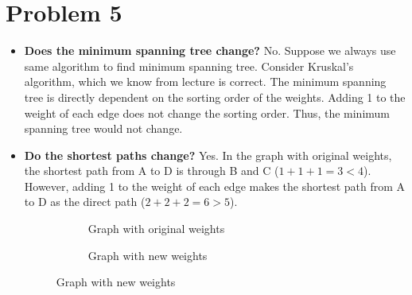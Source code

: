 \documentclass{article}
\begin{document}
\pagebreak

\section*{Problem 5}


\begin{itemize}
\item {\bf Does the minimum spanning tree change?} No. Suppose we always use same algorithm to find minimum spanning tree. Consider Kruskal's algorithm, which we know from lecture is correct. The minimum spanning tree is directly dependent on the sorting order of the weights. Adding 1 to the weight of each edge does not change the sorting order. Thus, the minimum spanning tree would not change.
\item {\bf Do the shortest paths change? } Yes. In the graph with original weights, the shortest path from A to D is through B and C ($1+1+1=3<4$). However, adding 1 to the weight of each edge makes the shortest path from A to D as the direct path ($2+2+2=6>5$).

\begin{figure}[h]
\centering
\begin{subfigure}[h]{0.3\textwidth}
\caption{Graph with original weights}
\end{subfigure} \qquad
\begin{subfigure}[h]{0.3\textwidth}
\caption{Graph with new weights}
\end{subfigure}
\end{figure}

\end{itemize}
\end{document}
